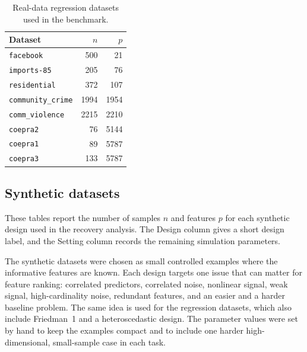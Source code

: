 \begin{table}[H]
  \centering
  \scriptsize
  \setlength{\tabcolsep}{5pt}
  \begin{tabular}{@{}lrr@{}}
    \toprule
    Dataset & $n$ & $p$ \\
    \midrule
    \nolinkurl{facebook} & 500 & 21 \\
    \nolinkurl{imports-85} & 205 & 76 \\
    \nolinkurl{residential} & 372 & 107 \\
    \nolinkurl{community_crime} & 1994 & 1954 \\
    \nolinkurl{comm_violence} & 2215 & 2210 \\
    \nolinkurl{coepra2} & 76 & 5144 \\
    \nolinkurl{coepra1} & 89 & 5787 \\
    \nolinkurl{coepra3} & 133 & 5787 \\
    \bottomrule
  \end{tabular}
  \caption{Real-data regression datasets used in the benchmark.}
  \label{tab:real-dataset-inventory-reg}
\end{table}

\subsection{Synthetic datasets}

These tables report the number of samples $n$ and features $p$ for each
synthetic design used in the recovery analysis. The Design column gives a short
design label, and the Setting column records the remaining simulation
parameters.

The synthetic datasets were chosen as small controlled examples where the
informative features are known. Each design targets one issue that can matter
for feature ranking: correlated predictors, correlated noise, nonlinear signal,
weak signal, high-cardinality noise, redundant features, and an easier and a
harder baseline problem. The same idea is used for the regression datasets,
which also include Friedman~1 and a heteroscedastic design. The parameter
values were set by hand to keep the examples compact and to include one harder
high-dimensional, small-sample case in each task.

